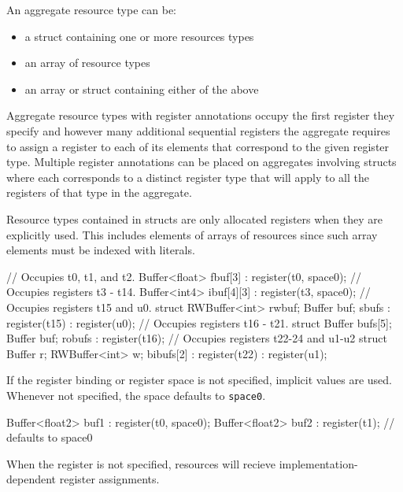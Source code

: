 An aggregate resource type can be:
\begin{itemize}
\item a struct containing one or more resources types
\item an array of resource types
\item an array or struct containing either of the above
\end{itemize}

Aggregate resource types with register annotations
occupy the first register they specify and however many additional sequential registers
the aggregate requires to assign a register to each of its elements that correspond to the given register type.
Multiple register annotations can be placed on aggregates involving structs where each corresponds to a distinct
register type that will apply to all the registers of that type in the aggregate.

\begin{note}
Resource types contained in structs are only allocated registers when they are explicitly used.
This includes elements of arrays of resources since such array elements must be indexed with literals.
\end{note}

\begin{HLSL}
  // Occupies t0, t1, and t2.
  Buffer<float> fbuf[3] : register(t0, space0);
  // Occupies registers t3 - t14.
  Buffer<int4> ibuf[4][3] : register(t3, space0);
  // Occupies registers t15 and u0.
  struct {RWBuffer<int> rwbuf; Buffer buf;} sbufs : register(t15) : register(u0);
  // Occupies registers t16 - t21.
  struct {Buffer bufs[5]; Buffer buf;} robufs : register(t16);
  // Occupies registers t22-24 and u1-u2
  struct {Buffer r; RWBuffer<int> w;} bibufs[2] : register(t22) : register(u1);
\end{HLSL}

If the register binding or register space is not specified, implicit values are used.
Whenever not specified, the space defaults to \texttt{space0}.

\begin{HLSL}
  Buffer<float2> buf1 : register(t0, space0);
  Buffer<float2> buf2 : register(t1); // defaults to space0
\end{HLSL}

When the register is not specified, resources will recieve implementation-dependent register assignments.
